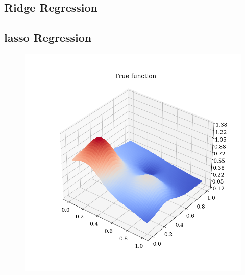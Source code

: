 \documentclass[twoside,11pt]{report}
\begin{document}
\subsection{Ridge Regression}
\label{sec:ridge}







\subsection{lasso Regression}
\label{sec:lasso}


\begin{figure}[!h]
    \begin{center}
    \includegraphics{../runsAndAdditions/trueFunction.png}
    \end{center}
\end{figure}
\end{document}
